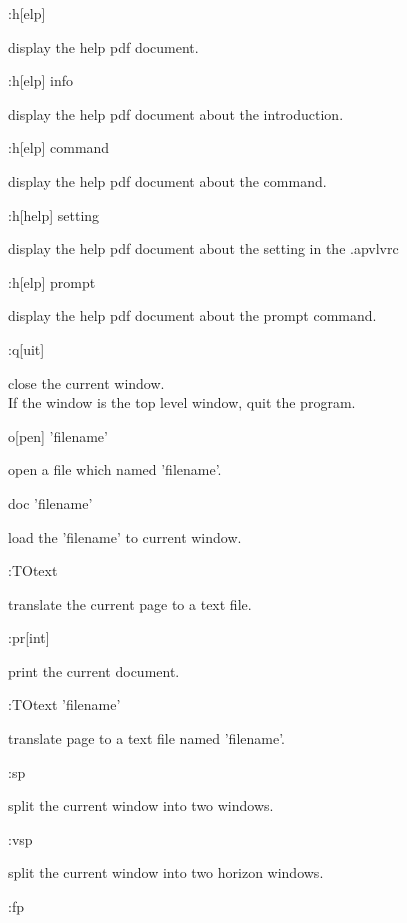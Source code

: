 \documentclass[a4paper,12pt]{article}
\begin{document}
\begin{description}

\item :h[elp]

display the help pdf document.

\item :h[elp] info

display the help pdf document about the introduction.

\item :h[elp] command

display the help pdf document about the command.

\item :h[help] setting

display the help pdf document about the setting in the .apvlvrc

\item :h[elp] prompt

display the help pdf document about the prompt command.

\item :q[uit]

close the current window.\\
If the window is the top level window, quit the program.

\item o[pen] 'filename'

open a file which named 'filename'.

\item doc 'filename'

load the 'filename' to current window.

\item :TOtext

translate the current page to a text file.

\item :pr[int]

print the current document.

\item :TOtext 'filename'

translate page to a text file named 'filename'.
\item :sp

split the current window into two windows.

\item :vsp

split the current window into two horizon windows.

\item :fp


\end{description}
\end{document}

